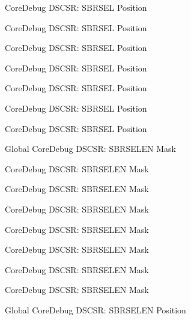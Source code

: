 \begin{DoxyRefList}
\label{deprecated__deprecated000648}%
%
Core\+Debug DSCSR\+: SBRSEL Position 

\label{deprecated__deprecated000546}%
%
Core\+Debug DSCSR\+: SBRSEL Position 

\label{deprecated__deprecated000367}%
%
Core\+Debug DSCSR\+: SBRSEL Position 

\label{deprecated__deprecated000225}%
%
Core\+Debug DSCSR\+: SBRSEL Position 

\label{deprecated__deprecated000095}%
%
Core\+Debug DSCSR\+: SBRSEL Position 

\label{deprecated__deprecated000443}%
%
Core\+Debug DSCSR\+: SBRSEL Position 

\label{deprecated__deprecated000288}%
%
Core\+Debug DSCSR\+: SBRSEL Position  
\item[Global \doxylink{group___c_m_s_i_s___s_c_b_ga5e5ed94cac1139165af161c008881805}{Core\+Debug\+\_\+\+DSCSR\+\_\+\+SBRSELEN\+\_\+\+Msk} ]\label{deprecated__deprecated000152}%
%
Core\+Debug DSCSR\+: SBRSELEN Mask 

\label{deprecated__deprecated000291}%
%
Core\+Debug DSCSR\+: SBRSELEN Mask 

\label{deprecated__deprecated000446}%
%
Core\+Debug DSCSR\+: SBRSELEN Mask 

\label{deprecated__deprecated000098}%
%
Core\+Debug DSCSR\+: SBRSELEN Mask 

\label{deprecated__deprecated000651}%
%
Core\+Debug DSCSR\+: SBRSELEN Mask 

\label{deprecated__deprecated000549}%
%
Core\+Debug DSCSR\+: SBRSELEN Mask 

\label{deprecated__deprecated000228}%
%
Core\+Debug DSCSR\+: SBRSELEN Mask 

\label{deprecated__deprecated000370}%
%
Core\+Debug DSCSR\+: SBRSELEN Mask  
\item[Global \doxylink{group___c_m_s_i_s___s_c_b_ga3eb88e444b678057db1b59272eebb1ad}{Core\+Debug\+\_\+\+DSCSR\+\_\+\+SBRSELEN\+\_\+\+Pos} ]\label{deprecated__deprecated000290}%
%
Core\+Debug DSCSR\+: SBRSELEN Position 


\end{DoxyRefList}
